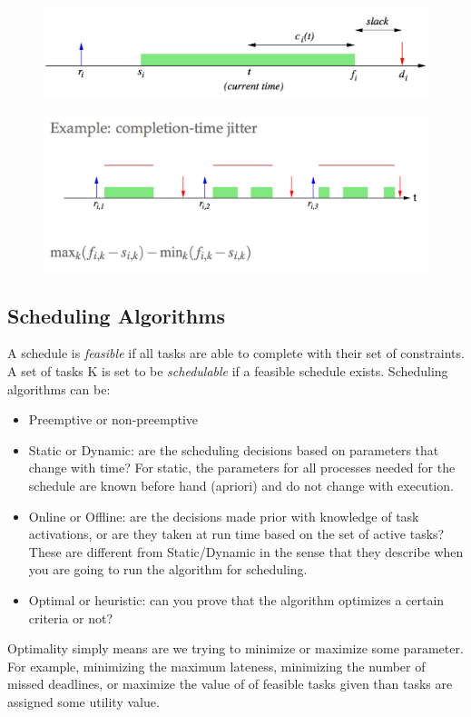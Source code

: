 \documentclass{hw}
\begin{document}
\begin{figure}[H]
  \centering
  \includegraphics[scale=.6]{schedule}
\end{figure}
\begin{figure}[H]
  \centering
  \includegraphics[scale=.6]{jitter}
\end{figure}

\subsection{Scheduling Algorithms}
A schedule is \emph{feasible} if all tasks are able to complete with
their set of constraints. A set of tasks K is set to be \emph{schedulable} if a 
feasible schedule exists. Scheduling algorithms can be:
\begin{itemize}
  \item Preemptive or non-preemptive
  \item Static or Dynamic: are the scheduling decisions based on parameters that
    change with time? For static, the parameters for all processes needed for the
    schedule are known before hand (apriori) and do not change with execution.
  \item Online or Offline: are the decisions made prior with knowledge of task 
    activations, or are they taken at run time based on the set of active tasks?
    These are different from Static/Dynamic in the sense that they describe when
    you are going to run the algorithm for scheduling. 
  \item Optimal or heuristic: can you prove that the algorithm optimizes a 
    certain criteria or not?
\end{itemize}
Optimality simply means are we trying to minimize or maximize some parameter. 
For example, minimizing the maximum lateness, minimizing the number of missed 
deadlines, or maximize the value of of feasible tasks given than tasks are 
assigned some utility value. \\
\end{document}
